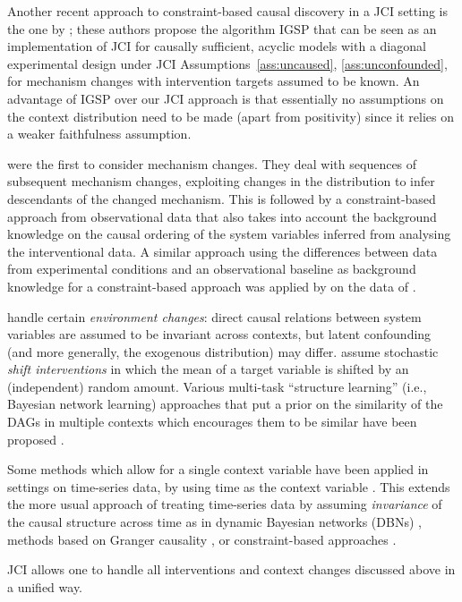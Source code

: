 \documentclass[twoside,11pt]{article}
\newcommand{\JCIAB}{\ref{ass:uncaused}, \ref{ass:unconfounded}}
\begin{document}
Another recent approach to constraint-based causal discovery in a JCI setting
is the one by \citet{YangKatcoffUhler2018}; these authors propose the algorithm
IGSP that can be seen as an implementation of JCI for causally sufficient, 
acyclic models with a diagonal experimental design under JCI Assumptions~\JCIAB, 
for mechanism changes with intervention targets assumed to be known. An advantage 
of IGSP over our JCI approach is that essentially no assumptions on the context 
distribution need to be made (apart from positivity) since it relies on a weaker
faithfulness assumption.

\citet{TianPearl2001} were the first to consider mechanism changes. They deal with
sequences of subsequent mechanism changes, exploiting changes in the distribution
to infer descendants of the changed mechanism. This is followed by a constraint-based
approach from observational data that also takes into account the background knowledge
on the causal ordering of the system variables inferred from analysing the interventional
data. A similar approach
using the differences between data from experimental conditions and an observational 
baseline as background knowledge for a constraint-based approach was applied by 
\citet{MagliacaneClaassenMooij_NIPS_16} on the data of \citet{SPP05}.

\citet{Claassen++_NIPS2010} handle certain \emph{environment changes}: direct causal
relations between system variables are assumed to be invariant across contexts, but
latent confounding (and more generally, the exogenous distribution) may differ.
\citet{Rothenhausler++2015} assume stochastic \emph{shift interventions} in which the 
mean of a target variable is shifted by an (independent) random amount.
Various multi-task ``structure learning'' (i.e., Bayesian network learning) approaches 
that put a prior on the similarity of the DAGs in multiple contexts which encourages
them to be similar have been proposed \citep[e.g.,][]{oates2014,oates2016exact}. 

Some methods which allow for a single context variable have been applied in settings
on time-series data, by using time as the context variable
\citep{Friedman++2000,Zhang++_IJCAI17}. This extends the more usual approach
of treating time-series data by assuming \emph{invariance} of the causal structure across
time as in dynamic Bayesian networks (DBNs) \citep{Murphy2002}, methods based on
Granger causality \citep{Gra69}, or constraint-based approaches \citep{EntnerHoyer2010}.

JCI allows one to handle all interventions and context changes discussed above in a unified way. 
\end{document}
